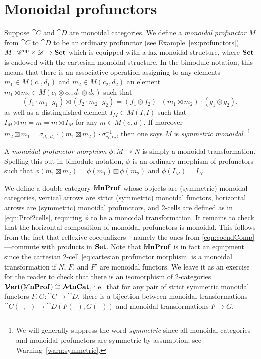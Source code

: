 \documentclass[11pt,oneside,article]{memoir}
\begin{document}
\section{Monoidal profunctors}
  \label{sec:monoidal_profunctors}

Suppose $\cat{C}$ and $\cat{D}$ are monoidal categories. We define a \emph{monoidal profunctor} $M$
from $\cat{C}$ to $\cat{D}$ to be an ordinary profunctor (see Example~\ref{ex:profunctors}) $M\colon
{\mathscr{C}}^{\text{op}}\times\mathscr{D}\to\mathbf{Set}$ which is equipped with a lax-monoidal structure, where $\mathbf{Set}$ is
endowed with the cartesian monoidal structure. In the bimodule notation, this means that there is an
associative operation assigning to any elements $m_1\in M(c_1,d_1)$ and $m_2\in M(c_2,d_2)$ an
element $m_1\boxtimes m_2\in M(c_1\otimes c_2,d_1\otimes d_2)$ such that
\[
   (f_1\cdot m_1\cdot g_1)\boxtimes(f_2\cdot m_2\cdot g_2)
      = (f_1\otimes f_2)\cdot(m_1\boxtimes m_2)\cdot(g_1\otimes g_2),
\]
as well as a distinguished element $I_M\in M(I,I)$ such that $I_M\boxtimes m = m = m\boxtimes I_M$
for any $m\in M(c,d)$. If moreover $m_2\boxtimes m_1 = \sigma_{d_1,d_2}\cdot(m_1\boxtimes
m_2)\cdot\sigma_{c_1,c_2}^{-1}$, then one says $M$ is \emph{symmetric monoidal}.%
\footnote{
  We will generally suppress the word \emph{symmetric} since all monoidal categories and monoidal
  profunctors are symmetric by assumption; see Warning~\ref{warn:symmetric}.
}

A \emph{monoidal profunctor morphism} $\phi\colon M\to N$ is simply a monoidal transformation.
Spelling this out in bimodule notation, $\phi$ is an ordinary morphism of profunctors such that
$\phi(m_1\boxtimes m_2)=\phi(m_1)\boxtimes\phi(m_2)$ and $\phi(I_M)=I_N$.


We define a double category $\mathbb{M}\mathbf{nProf}$ whose objects are (symmetric) monoidal categories, vertical
arrows are strict (symmetric) monoidal functors, horizontal arrows are (symmetric) monoidal
profunctors, and 2-cells are defined as in \eqref{eqn:Prof2cells}, requiring $\phi$ to be a monoidal
transformation. It remains to check that the horizontal composition of monoidal profunctors is
monoidal. This follows from the fact that reflexive coequalizers---namely the ones from
\eqref{eqn:coendComp}---commute with products in $\mathbf{Set}$. Note that $\mathbb{M}\mathbf{nProf}$ is in fact an
equipment since the cartesian 2-cell \eqref{eq:cartesian profunctor morphism} is a monoidal
transformation if $N$, $F$, and $F'$ are monoidal functors. We leave it as an exercise for the
reader to check that there is an isomorphism of 2-categories $\bm{\mathcal{V}}\mathbf{ert}(\mathbb{M}\mathbf{nProf})\cong\bm{\mathcal{M}}\mathbf{nCat}$, i.e.\
that for any pair of strict symmetric monoidal functors $F,G\colon\cat{C}\to\cat{D}$, there is a
bijection between monoidal transformations
$\cat{C}(\textrm{--},\textrm{--})\to\cat{D}(F(\textrm{--}),G(\textrm{--}))$ and monoidal
transformations $F\to G$.
\end{document}
